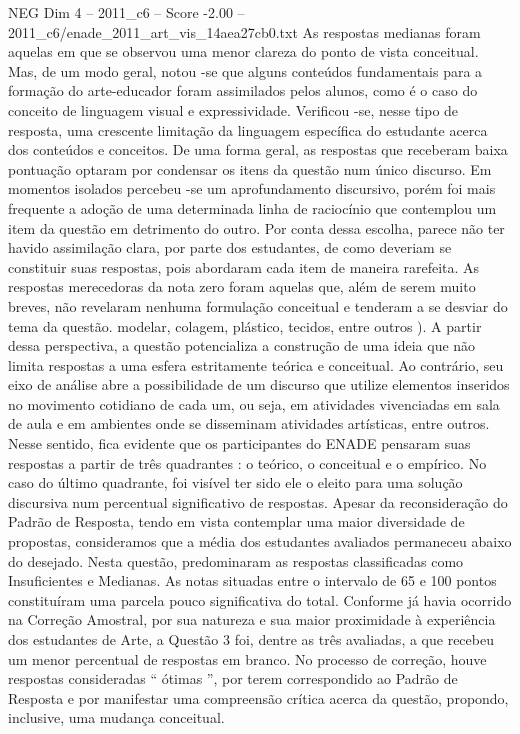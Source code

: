 \begin{textsample}{NEG Dim 4 – 2011\_c6 – Score -2.00 – 2011\_c6/enade\_2011\_art\_vis\_14aea27cb0.txt}
As respostas medianas foram aquelas em que se observou uma menor clareza do ponto de vista conceitual.
Mas, de um modo geral, notou -se que alguns conteúdos fundamentais para a formação do arte-educador foram assimilados pelos alunos, como é o caso do conceito de linguagem visual e expressividade.
Verificou -se, nesse tipo de resposta, uma crescente limitação da linguagem específica do estudante acerca dos conteúdos e conceitos.
De uma forma geral, as respostas que receberam baixa pontuação optaram por condensar os itens da questão num único discurso.
Em momentos isolados percebeu -se um aprofundamento discursivo, porém foi mais frequente a adoção de uma determinada linha de raciocínio que contemplou um item da questão em detrimento do outro.
Por conta dessa escolha, parece não ter havido assimilação clara, por parte dos estudantes, de como deveriam se constituir suas respostas, pois abordaram cada item de maneira rarefeita.
As respostas merecedoras da nota zero foram aquelas que, além de serem muito breves, não revelaram nenhuma formulação conceitual e tenderam a se desviar do tema da questão. modelar, colagem, plástico, tecidos, entre outros ).
A partir dessa perspectiva, a questão potencializa a construção de uma ideia que não limita respostas a uma esfera estritamente teórica e conceitual.
Ao contrário, seu eixo de análise abre a possibilidade de um discurso que utilize elementos inseridos no movimento cotidiano de cada um, ou seja, em atividades vivenciadas em sala de aula e em ambientes onde se disseminam atividades artísticas, entre outros.
Nesse sentido, fica evidente que os participantes do ENADE pensaram suas respostas a partir de três quadrantes : o teórico, o conceitual e o empírico.
No caso do último quadrante, foi visível ter sido ele o eleito para uma solução discursiva num percentual significativo de respostas.
Apesar da reconsideração do Padrão de Resposta, tendo em vista contemplar uma maior diversidade de propostas, consideramos que a média dos estudantes avaliados permaneceu abaixo do desejado.
Nesta questão, predominaram as respostas classificadas como Insuficientes e Medianas.
As notas situadas entre o intervalo de 65 e 100 pontos constituíram uma parcela pouco significativa do total.
Conforme já havia ocorrido na Correção Amostral, por sua natureza e sua maior proximidade à experiência dos estudantes de Arte, a Questão 3 foi, dentre as três avaliadas, a que recebeu um menor percentual de respostas em branco.
No processo de correção, houve respostas consideradas “ ótimas ”, por terem correspondido ao Padrão de Resposta e por manifestar uma compreensão crítica acerca da questão, propondo, inclusive, uma mudança conceitual.

\end{textsample}
